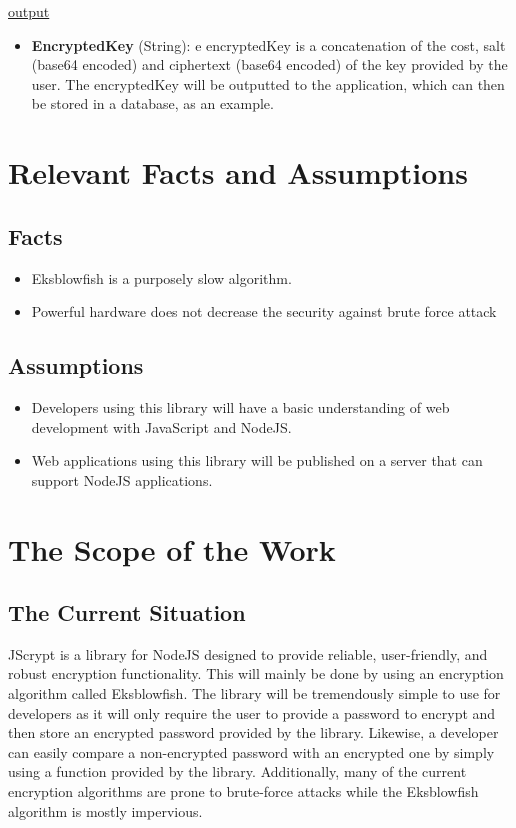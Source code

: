 \documentclass[12pt]{article}
\begin{document}
  \underline{output}
  \begin{itemize}
    \item \textbf{EncryptedKey} (String): e encryptedKey is a concatenation of the cost, salt (base64 encoded) and ciphertext (base64 encoded) of the key provided by the user. The encryptedKey will be outputted to the application, which can then be stored in a database, as an example. 
  \end{itemize}

\section{Relevant Facts and Assumptions}
\subsection{Facts}
  \begin{itemize}
    \item Eksblowfish is a purposely slow algorithm.
    \item Powerful hardware does not decrease the security against brute force attack
  \end{itemize}

\subsection{Assumptions}
  \begin{itemize}
    \item Developers using this library will have a basic understanding of web development with JavaScript and NodeJS.
    \item Web applications using this library will be published on a server that can support NodeJS applications.

  \end{itemize} 
\section*{}
\section{The Scope of the Work}
\subsection{The Current Situation}
   JScrypt is a library for NodeJS designed to provide reliable, user-friendly, and robust encryption functionality. This will mainly be done by using an encryption algorithm called Eksblowfish. The library will be tremendously simple to use for developers as it will only require the user to provide a password to encrypt and then store an encrypted password provided by the library. Likewise, a developer can easily compare a non-encrypted password with an encrypted one by simply using a function provided by the library. Additionally, many of the current encryption algorithms are prone to brute-force attacks while the Eksblowfish algorithm  is mostly impervious.
\end{document}
